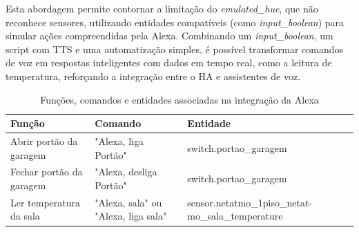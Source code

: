 Esta abordagem permite contornar a limitação do \textit{emulated\_hue}, que não reconhece sensores, utilizando entidades compatíveis (como \textit{input\_boolean}) para simular ações compreendidas pela Alexa. Combinando um \textit{input\_boolean}, um script com TTS e uma automatização simples, é possível transformar comandos de voz em respostas inteligentes com dados em tempo real, como a leitura de temperatura, reforçando a integração entre o \gls{HA} e assistentes de voz.

\begin{table}[H]
\centering
{}
\begin{tabularx}{\textwidth}{|X|X|X|}
\hline
\textbf{Função} & \textbf{Comando} & \textbf{Entidade} \\
\hline

Abrir portão da garagem & "Alexa, liga Portão" & switch.portao\_garagem \\

Fechar portão da garagem & "Alexa, desliga Portão" & switch.portao\_garagem \\

Ler temperatura da sala & \textnormal"Alexa, sala" ou \textnormal"Alexa, liga sala" & sensor.netatmo\_1piso\_netat-mo\_sala\_temperature \\

\hline
\end{tabularx}
\caption{Funções, comandos e entidades associadas na integração da Alexa}
\end{table}